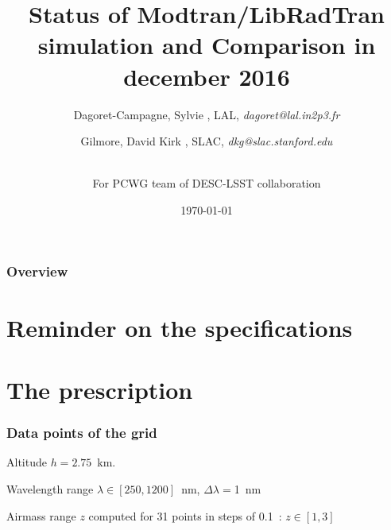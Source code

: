 \documentclass{beamer}
\title[MT-RT Comparison]{Status of Modtran/LibRadTran simulation and Comparison in december 2016} %
\author{
Dagoret-Campagne, Sylvie  ,  LAL, %
\textit{dagoret@lal.in2p3.fr} %
\\
\and
Gilmore, David Kirk , SLAC,
\textit{dkg@slac.stanford.edu} %
\and
\\
For PCWG team of DESC-LSST collaboration 
}
\date{\today} %
\begin{document}
\begin{frame}
\titlepage %
\end{frame}

\begin{frame}
\frametitle{Overview} %
\tableofcontents %
\end{frame}



\section{Reminder on the specifications}


\section{The prescription}

\begin{frame}
\frametitle{Data points of the grid}
\begin{block}{Altitude}
$h=2.75$~km.
\end{block}

\begin{block}{Wavelength range}
$\lambda \in [250,1200]$~nm, $\Delta \lambda=$1~nm
\end{block}

\begin{block}{Airmass range}
$z$ computed for 31 points in steps of 0.1~: $z \in [1,3]$
\end{block}

\end{frame}
\end{document}
